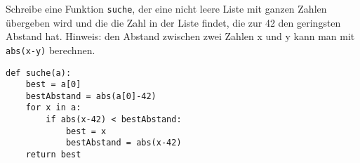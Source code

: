 \question[4]
Schreibe eine Funktion \texttt{suche}, der eine nicht leere Liste
mit ganzen Zahlen übergeben wird und die die Zahl in der Liste findet,
die zur 42 den geringsten Abstand hat. Hinweis: den Abstand zwischen
zwei Zahlen x und y kann man mit \texttt{abs(x-y)} berechnen.

\begin{solutionbox}{9cm}
\begin{lstlisting}
def suche(a):
    best = a[0]
    bestAbstand = abs(a[0]-42)
    for x in a:
        if abs(x-42) < bestAbstand:
            best = x
            bestAbstand = abs(x-42)
    return best
\end{lstlisting}
\end{solutionbox}
